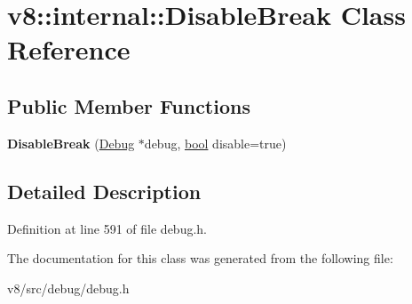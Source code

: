 \hypertarget{classv8_1_1internal_1_1DisableBreak}{}\section{v8\+:\+:internal\+:\+:Disable\+Break Class Reference}
\label{classv8_1_1internal_1_1DisableBreak}
\subsection*{Public Member Functions}
\begin{DoxyCompactItemize}
\item 
\mbox{\label{classv8_1_1internal_1_1DisableBreak_ab2264fe585387dfcbbbce00b8e7c0e0c}} 
{\bfseries Disable\+Break} (\mbox{\hyperlink{classv8_1_1internal_1_1Debug}{Debug}} $\ast$debug, \mbox{\hyperlink{classbool}{bool}} disable=true)
\end{DoxyCompactItemize}


\subsection{Detailed Description}


Definition at line 591 of file debug.\+h.



The documentation for this class was generated from the following file\+:\begin{DoxyCompactItemize}
\item 
v8/src/debug/debug.\+h\end{DoxyCompactItemize}
